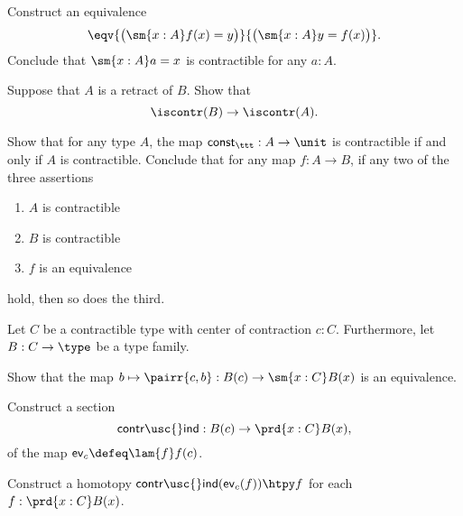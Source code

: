 \begin{exercises}
\item Construct an equivalence 
\begin{equation*}
\eqv{\big(\sm{x:A}f(x)=y\big)}{\big(\sm{x:A}y=f(x)\big)}.
\end{equation*}
Conclude that $\sm{x:A}a=x$ is contractible for any $a:A$.
\item \label{ex:contr_retr}Suppose that $A$ is a retract of $B$. Show that
\begin{equation*}
\iscontr(B)\to\iscontr(A).
\end{equation*}
\item \label{ex:contr_equiv}Show that for any type $A$, the map $\mathsf{const}_\ttt : A\to \unit$ is contractible if and only if $A$ is contractible. Conclude that for any map $f:A\to B$, if any two of the three assertions
\begin{enumerate}
\item $A$ is contractible
\item $B$ is contractible
\item $f$ is an equivalence
\end{enumerate}
hold, then so does the third.
\item \label{ex:contr_ind} Let $C$ be a contractible type with center of contraction $c:C$. Furthermore, let $B:C\to\type$ be a type family. 
\begin{subexenum}
\item Show that the map $b\mapsto\pairr{c,b}:B(c)\to\sm{x:C}B(x)$ is an equivalence.
\item Construct a section
\begin{equation*}
\mathsf{contr\usc{}ind}:B(c)\to \prd{x:C}B(x),
\end{equation*}
of the map $\mathsf{ev}_c\defeq\lam{f}f(c)$.
\item Construct a homotopy $\mathsf{contr\usc{}ind}(\mathsf{ev}_c(f))\htpy f$ for each $f:\prd{x:C}B(x)$.
\end{subexenum}
\end{exercises}
